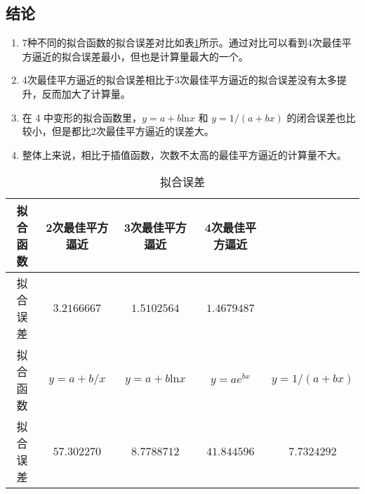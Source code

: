 \subsection{结论}

\begin{enumerate}[(1)]
    \item 7种不同的拟合函数的拟合误差对比如表\ref{tab:error}所示。通过对比可以看到4次最佳平方逼近的拟合误差最小，但也是计算量最大的一个。
    \item 4次最佳平方逼近的拟合误差相比于3次最佳平方逼近的拟合误差没有太多提升，反而加大了计算量。
    \item 在 4 中变形的拟合函数里，$y=a+b\mathrm{ln}x$ 和 $y={1}/(a+bx)$ 的闭合误差也比较小，但是都比2次最佳平方逼近的误差大。
    \item 整体上来说，相比于插值函数，次数不太高的最佳平方逼近的计算量不大。
\end{enumerate}

\begin{table}[ht]\centering
    \caption{拟合误差}
    \label{tab:error}
    \begin{tabular}{c|cccc}
        拟合函数 & 2次最佳平方逼近 & 3次最佳平方逼近 & 4次最佳平方逼近 & \\
        \hline
        拟合误差 & $3.2166667$ & $1.5102564$ & $1.4679487$ & \\
        \hline\hline
        拟合函数 & $y=a+{b}/{x}$ & $y=a+b\mathrm{ln}x$ & $y=ae^{bx}$ & $y={1}/(a+bx)$ \\
        \hline
        拟合误差 & $57.302270$ & $8.7788712$ & $41.844596$ & $7.7324292$
    \end{tabular}
\end{table}


